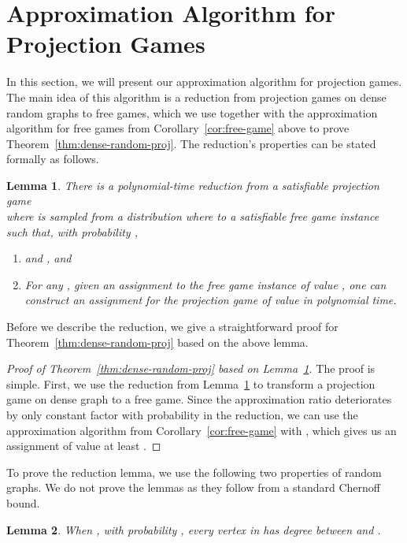 \documentclass{article}
\newtheorem{lemma}{Lemma}
\begin{document}
\section{Approximation Algorithm for Projection Games}

In this section, we will present our approximation algorithm for projection games. The main idea of this algorithm is a reduction from projection games on dense random graphs to free games, which we use together with the approximation algorithm for free games from Corollary~\ref{cor:free-game} above to prove Theorem~\ref{thm:dense-random-proj}. The reduction's properties can be stated formally as follows. \\

\begin{lemma} \label{lem:reduction-dense}
There is a polynomial-time reduction from a satisfiable projection game \\  where  is sampled from a distribution  where  to a satisfiable free game instance  such that, with probability ,
\begin{enumerate} \itemsep0em
  \item  and , and
  \item For any , given an assignment  to the free game instance of value , one can construct an assignment  for the projection game of value  in polynomial time.
\end{enumerate}
\end{lemma}

Before we describe the reduction, we give a straightforward proof for Theorem~\ref{thm:dense-random-proj} based on the above lemma.

\begin{proof}[Proof of Theorem~\ref{thm:dense-random-proj} based on Lemma~\ref{lem:reduction-dense}]
The proof is simple. First, we use the reduction from Lemma~\ref{lem:reduction-dense} to transform a projection game on dense graph to a free game. Since the approximation ratio deteriorates by only constant factor with probability  in the reduction, we can use the approximation algorithm from Corollary~\ref{cor:free-game} with , which gives us an assignment of value at least .
\end{proof}

To prove the reduction lemma, we use the following two properties of random graphs. We do not prove the lemmas as they follow from a standard Chernoff bound. \\

\begin{lemma} \label{lem:prop-dense-random1}
When , with probability , every vertex in  has degree between  and . \\
\end{lemma}
\end{document}
